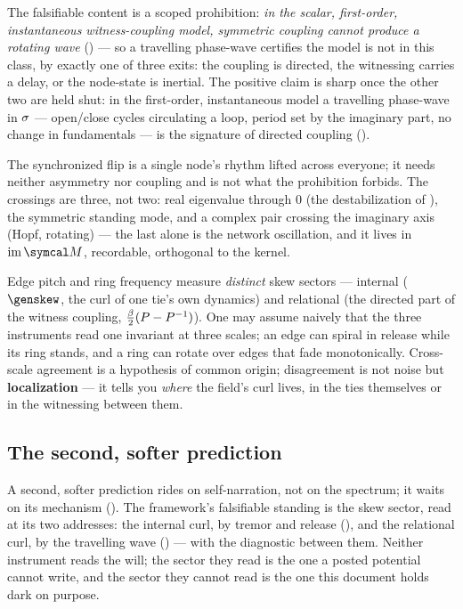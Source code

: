 \documentclass[../main]{subfiles}
\begin{document}
The falsifiable content is a scoped prohibition: \emph{in the scalar, first-order,
instantaneous witness-coupling model, symmetric coupling cannot produce a rotating wave}
() --- so a travelling phase-wave certifies the model is not in this class, by
exactly one of three exits: the coupling is directed, the witnessing carries a delay, or the
node-state is inertial. The positive claim is sharp once the other two are held shut: in the
first-order, instantaneous model a travelling phase-wave in $\sigma$ --- open/close cycles
circulating a loop, period set by the imaginary part, no change in fundamentals --- is the
signature of directed coupling ().

The synchronized flip is a single node's rhythm lifted across everyone; it needs neither
asymmetry nor coupling and is not what the prohibition forbids. The crossings are three, not
two: real eigenvalue through $0$ (the destabilization of ), the symmetric standing
mode, and a complex pair crossing the imaginary axis (Hopf, rotating) --- the last alone is
the network oscillation, and it lives in $\mathrm{im}\,\readout$, recordable, orthogonal to
the kernel.

\begin{proposition}
  Edge pitch and ring frequency measure \emph{distinct} skew sectors --- internal
  ($\genskew$, the curl of one tie's own dynamics) and relational (the directed part of
  the witness coupling, $\tfrac{\beta}2(P-P^{-1})$). One may
  assume naively that the three instruments read one invariant at three scales; an edge
  can spiral in release while its ring stands, and a ring can rotate over edges that fade
  monotonically. Cross-scale agreement is a hypothesis of common origin; disagreement is
  not noise but \textbf{localization} --- it tells you \emph{where} the field's curl
  lives, in the ties themselves or in the witnessing between them.
\end{proposition}

\subsection{The second, softer prediction}
\label{subsec:osc:soft}
%
A second, softer prediction rides on self-narration, not on the spectrum; it waits on its
mechanism (). The framework's falsifiable standing is
the skew sector, read at its two addresses: the internal curl, by tremor and release
(), and the relational curl, by the travelling wave
() --- with  the diagnostic between them. Neither
instrument reads the will; the sector they read is the one a posted potential cannot
write, and the sector they cannot read is the one this document holds dark on purpose.
\end{document}

